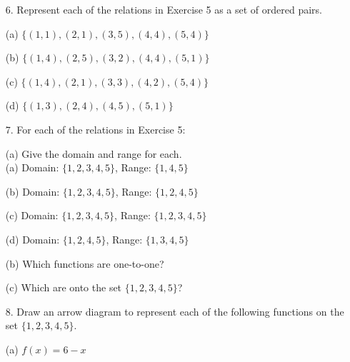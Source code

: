 \documentclass{article}
\begin{document}
\begin{itemize}
    
    \item[6.] Represent each of the relations in Exercise 5 as a set of ordered pairs.
    
    (a) {\color{blue} $\{(1,1),(2,1),(3,5),(4,4),(5,4)\}$}
    
    (b) {\color{blue} $\{(1,4),(2,5),(3,2),(4,4),(5,1)\}$}
    
    (c) {\color{blue} $\{(1,4),(2,1),(3,3),(4,2),(5,4)\}$}
    
    (d) {\color{blue} $\{(1,3),(2,4),(4,5),(5,1)\}$}
    
    \item[7.] For each of the relations in Exercise 5:
    
    (a) Give the domain and range for each.\\
    \hspace*{0.5cm}(a) {\color{blue} Domain: $\{1,2,3,4,5\}$, Range: $\{1,4,5\}$}
    
    \hspace*{0.5cm}(b) {\color{blue} Domain: $\{1,2,3,4,5\}$, Range: $\{1,2,4,5\}$}
    
    \hspace*{0.5cm}(c) {\color{blue} Domain: $\{1,2,3,4,5\}$, Range: $\{1,2,3,4,5\}$}
    
    \hspace*{0.5cm}(d) {\color{blue} Domain: $\{1,2,4,5\}$, Range: $\{1,3,4,5\}$}
    
    (b) Which functions are one-to-one?\\
    
    (c) Which are onto the set $\{1, 2, 3, 4, 5\}$?\\
    
    
    \item[8.] Draw an arrow diagram to represent each of the following functions on the set $\{1, 2, 3, 4, 5\}$.
    
    (a) $f(x)=6-x$\\
\end{itemize}
\end{document}
